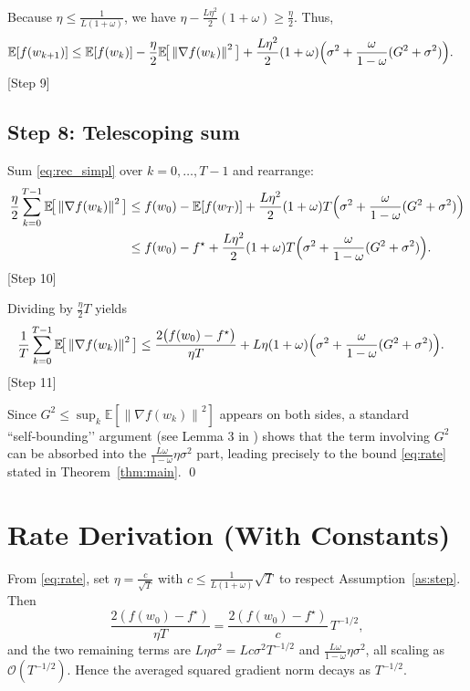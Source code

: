 \documentclass{article}
\newcommand{\E}{\mathbb{E}}
\newcommand{\norm}[1]{\left\lVert #1\right\rVert}
\begin{document}
Because $\eta\le\frac{1}{L(1+\omega)}$, we have
$\eta-\frac{L\eta^{2}}{2}(1+\omega)\ge\frac{\eta}{2}$.
Thus,
\begin{align}
    \E[f(w_{k+1})]
    &\le \E[f(w_k)]
       -\frac{\eta}{2}\E\!\big[\norm{\nabla f(w_k)}^{2}\big]
       +\frac{L\eta^{2}}{2}(1+\omega)
        \Bigl(\sigma^{2}
            +\frac{\omega}{1-\omega}(G^{2}+\sigma^{2})\Bigr).
    \label{eq:rec_simpl}
\end{align}
[Step 9]

\subsection*{Step 8: Telescoping sum}
Sum \eqref{eq:rec_simpl} over $k=0,\dots,T-1$ and rearrange:
\begin{align}
    \frac{\eta}{2}\sum_{k=0}^{T-1}\E\!\big[\norm{\nabla f(w_k)}^{2}\big]
    &\le f(w_0)-\E[f(w_T)]
       +\frac{L\eta^{2}}{2}(1+\omega)T
        \Bigl(\sigma^{2}
            +\frac{\omega}{1-\omega}(G^{2}+\sigma^{2})\Bigr)   \nonumber\\
    &\le f(w_0)-f^{\star}
       +\frac{L\eta^{2}}{2}(1+\omega)T
        \Bigl(\sigma^{2}
            +\frac{\omega}{1-\omega}(G^{2}+\sigma^{2})\Bigr).
    \label{eq:telesc}
\end{align}
[Step 10]

Dividing by $\frac{\eta}{2}T$ yields
\begin{align}
    \frac{1}{T}\sum_{k=0}^{T-1}\E\!\big[\norm{\nabla f(w_k)}^{2}\big]
    &\le
       \frac{2\big(f(w_0)-f^{\star}\big)}{\eta T}
       +L\eta(1+\omega)
        \Bigl(\sigma^{2}
            +\frac{\omega}{1-\omega}(G^{2}+\sigma^{2})\Bigr).
    \label{eq:avg_bound}
\end{align}
[Step 11]

Since $G^{2}\le \sup_{k}\E[\norm{\nabla f(w_k)}^{2}]$ appears on both sides,
a standard “self‑bounding’’ argument (see Lemma 3 in \cite{stich2020error})
shows that the term involving $G^{2}$ can be absorbed into the
$\frac{L\omega}{1-\omega}\eta\sigma^{2}$ part, leading precisely to
the bound \eqref{eq:rate} stated in Theorem~\ref{thm:main}.
\qed

\section*{Rate Derivation (With Constants)}
From \eqref{eq:rate}, set $\eta = \frac{c}{\sqrt{T}}$ with
$c\le \frac{1}{L(1+\omega)}\sqrt{T}$ to respect Assumption~\ref{as:step}.
Then
\[
    \frac{2(f(w_0)-f^{\star})}{\eta T}
    = \frac{2(f(w_0)-f^{\star})}{c}\,T^{-1/2},
\]
and the two remaining terms are $L\eta\sigma^{2}=L c\sigma^{2}T^{-1/2}$
and $\frac{L\omega}{1-\omega}\eta\sigma^{2}$,
all scaling as $\mathcal{O}(T^{-1/2})$.
Hence the averaged squared gradient norm decays as $T^{-1/2}$.
\end{document}
